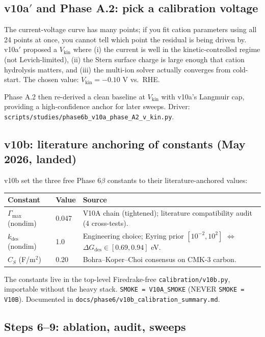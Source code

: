\documentclass[11pt]{article}
\begin{document}
\subsection{v10a$'$ and Phase A.2: pick a calibration voltage}

The current-voltage curve has many points; if you fit cation
parameters using all 24 points at once, you cannot tell which point
the residual is being driven by. v10a$'$ proposed a
 $V_{\mathrm{kin}}$ where (i) the
current is well in the kinetic-controlled regime (not Levich-limited),
(ii) the Stern surface charge is large enough that cation hydrolysis
matters, and (iii) the multi-ion solver actually converges from
cold-start. The chosen value: $V_{\mathrm{kin}} = -0.10$ V vs.\ RHE.

Phase A.2 then re-derived a clean baseline at $V_{\mathrm{kin}}$
with v10a's Langmuir cap, providing a high-confidence anchor for
later sweeps. Driver:
\texttt{scripts/studies/phase6b\_v10a\_phase\_A2\_v\_kin.py}.

\subsection{v10b: literature anchoring of constants (May 2026, landed)}

v10b set the three free Phase 6$\beta$ constants to their
literature-anchored values:
\begin{center}
\begin{tabular}{lll}
\toprule
\textbf{Constant} & \textbf{Value} & \textbf{Source} \\
\midrule
$\Gamma_{\max}$ (nondim) & 0.047 & V10A chain (tightened); literature compatibility audit (4 cross-tests). \\
$k_{\mathrm{des}}$ (nondim) & 1.0 & Engineering choice; Eyring prior $[10^{-2}, 10^{2}]$ $\Leftrightarrow$ $\Delta G_{\mathrm{des}} \in [0.69, 0.94]$ eV. \\
$C_S$ (F/m$^2$) & 0.20 & Bohra--Koper--Choi consensus on CMK-3 carbon. \\
\bottomrule
\end{tabular}
\end{center}
The constants live in the top-level Firedrake-free
\texttt{calibration/v10b.py}, importable without the heavy stack.
 \texttt{SMOKE = V10A\_SMOKE} (NEVER
\texttt{SMOKE = V10B}). Documented in
\texttt{docs/phase6/v10b\_calibration\_summary.md}.

\subsection{Steps 6--9: ablation, audit, sweeps}
\end{document}
